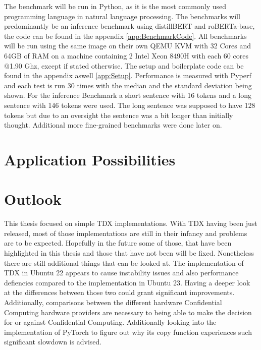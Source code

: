 The benchmark will be run in Python, as it is the most commonly used programming language in natural language processing. The benchmarks will predominantly be an inference benchmark using distillBERT and roBERTa-base, the code can be found in the appendix \ref{app:BenchmarkCode}. All benchmarks will be run using the same image on their own QEMU KVM with 32 Cores and 64GB of RAM on a machine containing 2 Intel Xeon 8490H with each 60 cores @1.90 Ghz, except if stated otherwise. The setup and boilerplate code can be found in the appendix aswell \ref{app:Setup}. Performance is measured with Pyperf and each test is run 30 times with the median and the standard deviation being shown.
For the inference Benchmark a short sentence with 16 tokens and a long sentence with 146 tokens were used. The long sentence was supposed to have 128 tokens but due to an oversight the sentence was a bit longer than initially thought. Additional more fine-grained benchmarks were done later on.



\section{Application Possibilities}




\section{Outlook}

This thesis focused on simple TDX implementations. With TDX having been just released, most of those implementations are still in their infancy and problems are to be expected. Hopefully in the future some of those, that have been highlighted in this thesis and those that have not been will be fixed. Nonetheless there are still additional things that can be looked at. The implementation of TDX in Ubuntu 22 appears to cause instability issues and also performance defiencies compared to the implementation in Ubuntu 23. Having a deeper look at the differences between those two could grant significant improvements. Additionally, comparisons between the different hardware Confidential Computing hardware providers are necessary to being able to make the decision for or against Confidential Computing. Additionally looking into the implementation of PyTorch to figure out why its copy function experiences such significant slowdown is advised. 

